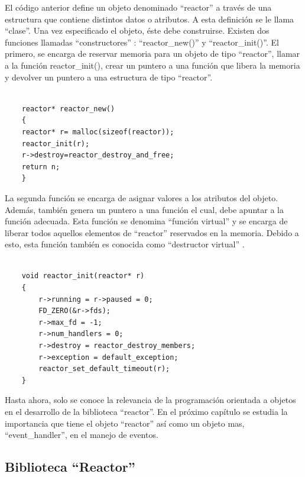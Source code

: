 El código anterior define un objeto denominado ``reactor'' a través de una estructura que contiene distintos datos o atributos. A esta definición se le llama ``clase''. Una vez especificado el objeto, éste debe construirse. Existen dos funciones llamadas ``constructores'' \citep{franciscoobjeto}: ``reactor\_new()'' y ``reactor\_init()''. El primero, se encarga de reservar memoria para un objeto de tipo ``reactor'', llamar a la función reactor\_init(), crear un puntero a una función que libera la memoria y devolver un puntero a una estructura de tipo ``reactor''. \\

    \begin{verbatim}
    
    reactor* reactor_new()
    {
    reactor* r= malloc(sizeof(reactor));
    reactor_init(r);
    r->destroy=reactor_destroy_and_free;
    return n;
    }
    \end{verbatim}

La segunda función se encarga de asignar valores a los atributos del objeto. Además, también genera un puntero a una función el cual, debe apuntar a la función adecuada. Esta función se denomina ``función virtual'' y se encarga de liberar todos aquellos elementos de ``reactor'' reservados en la memoria. Debido a esto, esta función también es conocida como ``destructor virtual'' \citep{franciscoobjeto}.\\
    

    \begin{verbatim}
    
    void reactor_init(reactor* r)
    {
        r->running = r->paused = 0;
        FD_ZERO(&r->fds);
        r->max_fd = -1;
        r->num_handlers = 0;
        r->destroy = reactor_destroy_members;
        r->exception = default_exception;
        reactor_set_default_timeout(r);
    }
    \end{verbatim}
    
Hasta ahora, solo se conoce la relevancia de la programación orientada a objetos en el desarrollo de la biblioteca ``reactor''. En el próximo capítulo se estudia la importancia que tiene el objeto ``reactor'' así como un objeto mas, ``event\_handler'', en el manejo de eventos.
    
\subsection{Biblioteca ``Reactor''}\label{s2_1_6}

